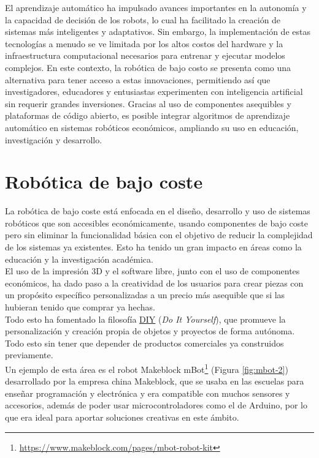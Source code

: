 El aprendizaje automático ha impulsado avances importantes en la autonomía y la capacidad de decisión de los robots, lo cual ha facilitado la creación de sistemas más inteligentes y adaptativos. Sin embargo, la implementación de estas tecnologías a menudo se ve limitada por los altos costos del hardware y la infraestructura computacional necesarios para entrenar y ejecutar modelos complejos. En este contexto, la robótica de bajo costo se presenta como una alternativa para tener acceso a estas innovaciones, permitiendo así que investigadores, educadores y entusiastas experimenten con inteligencia artificial sin requerir grandes inversiones. Gracias al uso de componentes asequibles y plataformas de código abierto, es posible integrar algoritmos de aprendizaje automático en sistemas robóticos económicos, ampliando su uso en educación, investigación y desarrollo.

 
\label{sec:cuartaseccion}


\section{Robótica de bajo coste}
\label{sec:quintaseccion}

La robótica de bajo coste está enfocada en el diseño, desarrollo y uso de sistemas robóticos que son accesibles económicamente, usando componentes de bajo coste pero sin eliminar la funcionalidad básica con el objetivo de reducir la complejidad de los sistemas ya existentes. Esto ha tenido un gran impacto en áreas como la educación y la investigación académica.\\

El uso de la impresión 3D y el software libre, junto con el uso de componentes económicos, ha dado paso a la creatividad de los usuarios para crear piezas con un propósito específico personalizadas a un precio más asequible que si las hubieran tenido que comprar ya hechas.\\


Todo esto ha fomentado la filosofía \hyperlink{DIY}{DIY} (\textit{Do It Yourself}), que promueve la personalización y creación propia de objetos y proyectos de forma autónoma. Todo esto sin tener que depender de productos comerciales ya construidos previamente.\\

Un ejemplo de esta área es el robot Makeblock mBot\footnote{\url{https://www.makeblock.com/pages/mbot-robot-kit}} (Figura \ref{fig:mbot-2}) desarrollado por la empresa china Makeblock, que se usaba en las escuelas para enseñar programación y electrónica y era compatible con muchos sensores y accesorios, además de poder usar microcontroladores como el de Arduino, por lo que era ideal para aportar soluciones creativas en este ámbito.

